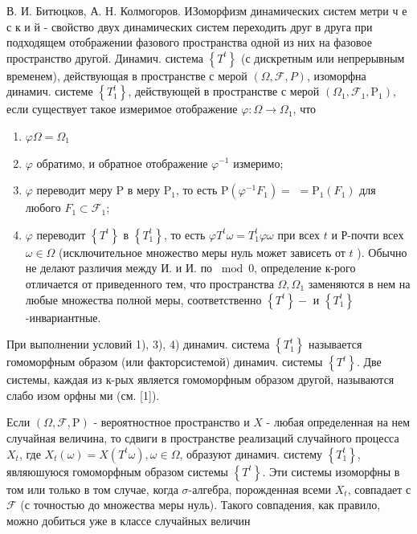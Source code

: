 \documentclass[10pt]{article}
\begin{document}
В. И. Битюцков, А. Н. Колмогоров. ИЗоморфизм динамических систем метри ч е с к и й - свойство двух динамических систем переходить друг в друга при подходящем отображении фазового пространства одной из них на фазовое пространство другой. Динамич. система $\left\{T^{t}\right\}$ (с дискретным или непрерывным временем), действующая в пространстве с мерой $(\Omega, \mathscr{F}, P)$, изоморфна динамич. системе $\left\{T_{1}^{t}\right\}$, действующей в пространстве с мерой $\left(\Omega_{1}, \mathscr{F}_{1}, \mathrm{P}_{1}\right)$, если существует такое измеримое отображение $\varphi: \Omega \rightarrow \Omega_{1}$, что



\begin{enumerate}

  \item $\varphi \Omega=\Omega_{1}$



  \item $\varphi$ обратимо, и обратное отображение $\varphi^{-1}$ измеримо;



  \item $\varphi$ переводит меру $\mathrm{P}$ в меру $\mathrm{P}_{1}$, то есть $\mathrm{P}\left(\varphi^{-1} F_{1}\right)=$ $=\mathrm{P}_{1}\left(F_{1}\right)$ для любого $F_{1} \subset \mathscr{F}_{1}$;



  \item $\varphi$ переводит $\left\{T^{t}\right\}$ в $\left\{T_{1}^{t}\right\}$, то есть $\varphi T^{t} \omega=T_{1}^{t} \varphi \omega$ при всех $t$ и Р-почти всех $\omega \in \Omega$ (исключительное множество меры нуль может зависеть от $t$ ). Обычно не делают различия между И. и И. по $\bmod 0$, определение к-рого отличается от приведенного тем, что пространства $\Omega, \Omega_{1}$ заменяются в нем на любые множества полной меры, соответственно $\left\{T^{t}\right\}-$ и $\left\{T_{1}^{t}\right\}$-инвариантные.



\end{enumerate}



При выполнении условий 1), 3), 4) динамич. система $\left\{T_{1}^{t}\right\}$ называется гомоморфным образом (или факторсистемой) динамич. системы $\left\{T^{t}\right\}$. Две системы, каждая из к-рых является гомоморфным образом другой, называются слабо изом орфны ми (см. [1]).



Если $(\Omega, \mathscr{F}, \mathrm{P})$ - вероятностное пространство и $X$ - любая определенная на нем случайная величина, то сдвиги в пространстве реализаций случайного процесса $X_{t}$, где $X_{t}(\omega)=X\left(T^{t} \omega\right), \omega \in \Omega$, образуют динамич. систему $\left\{T_{1}^{t}\right\}$, являюшуюся гомоморфным образом системы $\left\{T^{t}\right\}$. Эти системы изоморфны в том или только в том случае, когда $\sigma$-алгебра, порожденная всеми $X_{t}$, совпадает с $\mathscr{F}$ (с точностью до множества меры нуль). Такого совпадения, как правило, можно добиться уже в классе случайных величин
\end{document}

